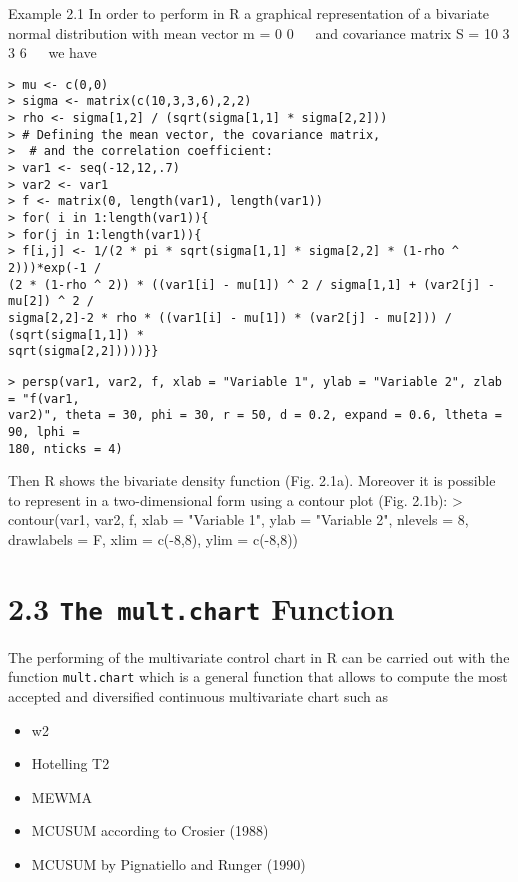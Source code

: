 \documentclass[a4paper,12pt]{article}
\begin{document}



Example 2.1
In order to perform in R a graphical representation of a bivariate normal distribution
with mean vector m = 0
0
 
and covariance matrix S = 10 3
3 6
 
we have

\begin{verbatim}
> mu <- c(0,0)
> sigma <- matrix(c(10,3,3,6),2,2)
> rho <- sigma[1,2] / (sqrt(sigma[1,1] * sigma[2,2]))
> # Defining the mean vector, the covariance matrix, 
>  # and the correlation coefficient:
> var1 <- seq(-12,12,.7)
> var2 <- var1
> f <- matrix(0, length(var1), length(var1))
> for( i in 1:length(var1)){
> for(j in 1:length(var1)){
> f[i,j] <- 1/(2 * pi * sqrt(sigma[1,1] * sigma[2,2] * (1-rho ^     2)))*exp(-1 /
(2 * (1-rho ^ 2)) * ((var1[i] - mu[1]) ^ 2 / sigma[1,1] + (var2[j] - mu[2]) ^ 2 /
sigma[2,2]-2 * rho * ((var1[i] - mu[1]) * (var2[j] - mu[2])) / (sqrt(sigma[1,1]) *
sqrt(sigma[2,2]))))}}
\end{verbatim}

\begin{framed}
\begin{verbatim}
> persp(var1, var2, f, xlab = "Variable 1", ylab = "Variable 2", zlab = "f(var1,
var2)", theta = 30, phi = 30, r = 50, d = 0.2, expand = 0.6, ltheta = 90, lphi =
180, nticks = 4)

\end{verbatim}
\end{framed}
Then R shows the bivariate density function (Fig. 2.1a).
Moreover it is possible to represent in a two-dimensional form using a contour
plot (Fig. 2.1b):
> contour(var1, var2, f, xlab = "Variable 1", ylab = "Variable 2", nlevels = 8,
drawlabels = F, xlim = c(-8,8), ylim = c(-8,8))




\section{2.3 \texttt{The mult.chart} Function}
The performing of the multivariate control chart in R can be carried out with the
function \texttt{mult.chart} which is a general function that allows to compute the most
accepted and diversified continuous multivariate chart such as

\begin{itemize}
	\item w2
	\item Hotelling T2
	\item MEWMA
	\item MCUSUM according to Crosier (1988)
	\item MCUSUM by Pignatiello and Runger (1990)
\end{itemize}
\end{document}
